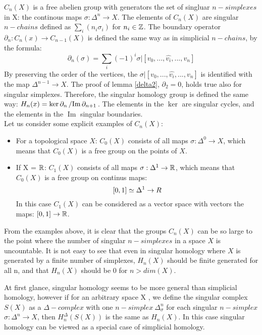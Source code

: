 \documentclass[11pt,a4paper]{report}
\DeclareMathOperator{\Ima}{Im}
\begin{document}
     $C_n(X)$ is a free abelien group with generators the set of singluar $n-simplexes$ in X: the continous maps $\sigma: \Delta^n \rightarrow X$. The elements of $C_n(X)$ are singular $n-chains$ defined as $\sum_i(n_i\sigma_i)$ for $n_i \in \mathbb{Z}$. The boundary operator $\partial_n: C_n(x) \rightarrow C_{n-1}(X)$ is defined the same way as in simplicial $n-chains$, by the formula: 
     \[
		         \partial_n(\sigma) = \sum\limits_i (-1)^i \sigma | [v_0, ... ,\hat{v_i}, ... , v_n]
              \] 
     By preserving the order of the vertices, the $\sigma |[v_0, ... ,\hat{v_i}, ... , v_n]$ is identified with the map $\Delta^{n-1} \rightarrow X$. The proof of lemma \ref{delta2}, $\partial_2 = 0$, holds true also for singular simplexes. Therefore, the singular homology group is defined the same way: $H_n(x) = \ker\partial_n \left/ \Ima \partial_{n+1} \right.$. The elements in the $\ker$ are singular cycles, and the elements in the $\Ima$ singular boundaries. \\
     
      Let us consider some explicit examples of $C_n(X)$: 
      \begin{itemize}
       \item 
      For a topological space $X$: 
      $C_0(X)$ consists of all maps $\sigma: \Delta^0 \rightarrow X$, which means that $C_0(X)$ is a free group on the points of $X$.
      \item
      If X = $\mathbb{R}$: $C_1(X)$ consists of all maps $\sigma: \Delta^1 \rightarrow \mathbb{R}$, which means that $C_0(X)$ is a free group on continus maps:
      \[
        [0, 1] \simeq \Delta^1 \rightarrow \\R
      \]
      In this case $C_1(X)$ can be considered as a vector space with vectors the maps: $[0, 1] \rightarrow \mathbb{R}$.
      \end{itemize}
      
    From the examples above, it is clear that the groups $C_n(X)$ can be so large to the point where the number of singular $n-simplexes$ in a space $X$ is uncountable. It is not easy to see that even in singular homology where $X$ is generated by a finite number of simplexes, $H_n(X)$ should be finite generated for all n, and that $H_n(X)$ should be 0 for $n > dim(X)$. 
    
    At first glance, singular homology seems to be more general than simplicial homology, however if for an arbitrary space X , we define the singular complex $S(X)$ as a $\Delta-complex$ with one $n-simplex \ \Delta_\sigma^n$ for each singular $n-simplex$ $\sigma: \Delta^n \rightarrow X$, then $H_n^\Delta(S(X))$ is the same as $H_n(X)$. In this case singular homology can be viewed as a special case of simplicial homology.
    
\end{document}

